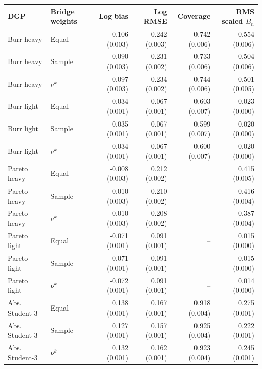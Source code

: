 \begin{tabular}{llrrrr}
\toprule
DGP & Bridge weights & Log bias & Log RMSE & Coverage & RMS scaled $B_n$ \\
\midrule
Burr heavy & Equal & 0.106 (0.003) & 0.242 (0.003) & 0.742 (0.006) & 0.554 (0.006) \\
Burr heavy & Sample & 0.090 (0.003) & 0.231 (0.002) & 0.733 (0.006) & 0.504 (0.006) \\
Burr heavy & $\nu^k$ & 0.097 (0.003) & 0.234 (0.002) & 0.744 (0.006) & 0.501 (0.005) \\
Burr light & Equal & -0.034 (0.001) & 0.067 (0.001) & 0.603 (0.007) & 0.023 (0.000) \\
Burr light & Sample & -0.035 (0.001) & 0.067 (0.001) & 0.599 (0.007) & 0.020 (0.000) \\
Burr light & $\nu^k$ & -0.034 (0.001) & 0.067 (0.001) & 0.600 (0.007) & 0.020 (0.000) \\
Pareto heavy & Equal & -0.008 (0.003) & 0.212 (0.002) & -- & 0.415 (0.005) \\
Pareto heavy & Sample & -0.010 (0.003) & 0.210 (0.002) & -- & 0.416 (0.004) \\
Pareto heavy & $\nu^k$ & -0.010 (0.003) & 0.208 (0.002) & -- & 0.387 (0.004) \\
Pareto light & Equal & -0.071 (0.001) & 0.091 (0.001) & -- & 0.015 (0.000) \\
Pareto light & Sample & -0.071 (0.001) & 0.091 (0.001) & -- & 0.015 (0.000) \\
Pareto light & $\nu^k$ & -0.072 (0.001) & 0.091 (0.001) & -- & 0.014 (0.000) \\
Abs. Student-3 & Equal & 0.138 (0.001) & 0.167 (0.001) & 0.918 (0.004) & 0.275 (0.001) \\
Abs. Student-3 & Sample & 0.127 (0.001) & 0.157 (0.001) & 0.925 (0.004) & 0.222 (0.001) \\
Abs. Student-3 & $\nu^k$ & 0.132 (0.001) & 0.162 (0.001) & 0.923 (0.004) & 0.245 (0.001) \\
\bottomrule
\end{tabular}
